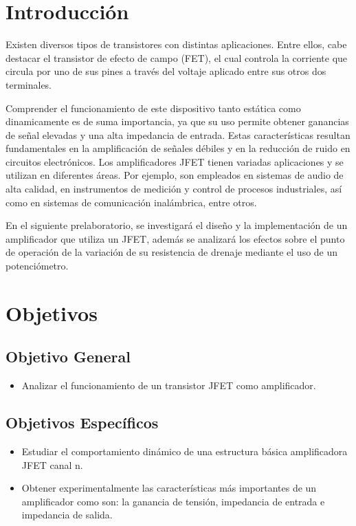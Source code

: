 \documentclass[12pt, a4paper]{article}
\begin{document}
    \newpage

    \section{Introducción}

    Existen diversos tipos de transistores con distintas aplicaciones. Entre ellos, cabe destacar el transistor de efecto de campo (FET), el cual controla la corriente que circula por uno de sus pines a través del voltaje aplicado entre sus otros dos terminales.
    
    Comprender el funcionamiento de este dispositivo tanto estática como dinamicamente es de suma importancia, ya que su uso permite obtener ganancias de señal elevadas y una alta impedancia de entrada. Estas características resultan fundamentales en la amplificación de señales débiles y en la reducción de ruido en circuitos electrónicos. Los amplificadores JFET tienen variadas aplicaciones y se utilizan en diferentes áreas. Por ejemplo, son empleados en sistemas de audio de alta calidad, en instrumentos de medición y control de procesos industriales, así como en sistemas de comunicación inalámbrica, entre otros.

    En el siguiente prelaboratorio, se investigará el diseño y la implementación de un amplificador que utiliza un JFET, además se analizará los efectos sobre el punto de operación de la variación de su resistencia de drenaje mediante el uso de un potenciómetro. 

    \newpage

    \section{Objetivos}
    
    \subsection{Objetivo General}
    \begin{itemize}
        \item Analizar el funcionamiento de un transistor JFET como amplificador.
    \end{itemize}

    \subsection{Objetivos Específicos}
    \begin{itemize}
        \item Estudiar el comportamiento dinámico de una estructura básica amplificadora JFET canal n.
        \item Obtener experimentalmente las características más importantes de un amplificador como son: la ganancia de tensión, impedancia de entrada e impedancia de salida.
    \end{itemize}
\end{document}
